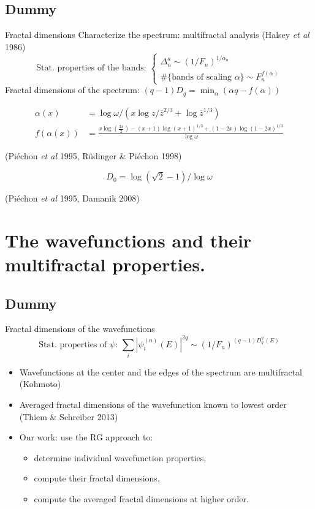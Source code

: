 \documentclass[xcolor=x11names,compress,professionalfonts]{beamer}
\renewcommand{\(}{\begin{columns}}
\renewcommand{\)}{\end{columns}}
\newcommand{\<}[1]{\begin{column}{#1}}
\renewcommand{\>}{\end{column}}
\newcommand{\zb}{\ensuremath{\overline{z}}}
\begin{document}
\subsection{Dummy}
\begin{frame}{Fractal dimensions}
	Characterize the spectrum: multifractal analysis (Halsey \emph{et al} 1986)
	\[
	\text{Stat. properties of the bands:~} 
	\begin{cases}
	\Delta_n^a \sim (1/F_n)^{1/\alpha_a} \\
	\#\{\text{bands of scaling~} \alpha \} \sim F_n^{f(\alpha)} 
	\end{cases}
	\]
	Fractal dimensions of the spectrum: $(q-1)D_q = \min_\alpha(\alpha q - f(\alpha))$
	
	\begin{align*}
		\alpha(x) &= \log \omega/\left( x \log z/\zb^{2/3} + \log \zb^{1/3} \right) \\
		f(\alpha(x)) &= \frac{x \log \left(\frac{3 x}{2}\right)- (x+1) \log (x+1)^{1/3}+ (1-2 x) \log (1-2 x)^{1/3}}{\log \omega}
	\end{align*}
	
	\begin{flushright}
	(Piéchon \emph{et al} 1995, Rüdinger \& Piéchon 1998)
	\end{flushright}
	\[ D_0 = \log(\sqrt{2}-1) / \log \omega \]
	\begin{flushright}
	(Piéchon \emph{et al} 1995, Damanik 2008)
	\end{flushright}
\end{frame}

\section{The wavefunctions and their multifractal properties.}
\subsection{Dummy}
\begin{frame}{Fractal dimensions of the wavefunctions}
	\[
	\text{Stat. properties of $\psi$:~} 
	\sum_i |\psi_i^{(n)}(E)|^{2q} \sim (1/F_n)^{(q-1)D_q^\psi(E)} 
	\]
\begin{itemize}
	\item Wavefunctions at the center and the edges of the spectrum are multifractal (Kohmoto)
	\item Averaged fractal dimensions of the wavefunction known to lowest order  (Thiem \& Schreiber 2013)
	\item Our work: use the RG approach to:
	\begin{itemize}
		\item  determine individual wavefunction properties,
		\item compute their fractal dimensions,
		\item compute the averaged fractal dimensions at higher order.
	\end{itemize}
\end{itemize}
\end{frame}
\end{document}

